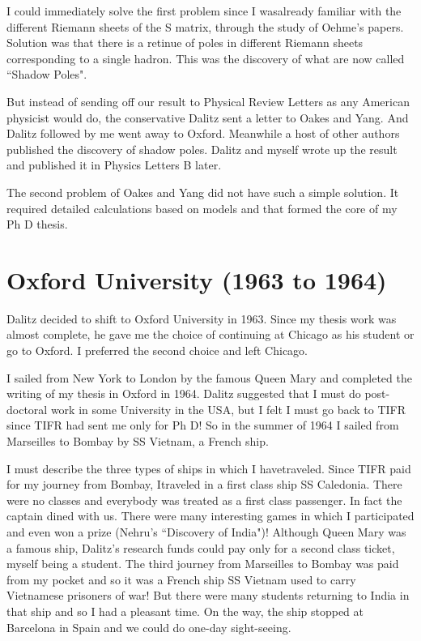 I could immediately solve the first problem since I was\break already familiar 
with the different Riemann sheets of the S matrix, through the study of 
Oehme's papers. Solution was that there is a retinue of poles in 
different Riemann sheets corresponding to a single hadron. This was the 
discovery of what are now called ``Shadow Poles".

But instead of sending off our result to Physical Review Letters as any 
American physicist would do, the conservative Dalitz sent a letter to 
Oakes and Yang. And Dalitz followed by me went away to Oxford. Meanwhile 
a host of other authors published the discovery of shadow poles. Dalitz 
and myself wrote up the result and published it in Physics Letters B 
later.

The second problem of Oakes and Yang did not have such a simple 
solution. It required detailed calculations based on models and that 
formed the core of my Ph D thesis.

\vspace{-\topsep}
\section*{Oxford University (1963 to 1964)}

Dalitz decided to shift to Oxford University in 1963. Since my thesis 
work was almost complete, he gave me the choice of conti\-nuing at Chicago 
as his student or go to Oxford. I preferred the second choice and left 
Chicago.

I sailed from New York to London by the famous Queen Mary and completed 
the writing of my thesis in Oxford in 1964. Dalitz suggested that I must 
do post-doctoral work in some University in the USA, but I felt I must go 
back to TIFR since TIFR had sent me only for Ph D! So in the summer of 
1964 I sailed from Marseilles to Bombay by SS Vietnam, a French ship.

I must describe the three types of ships in which I have\break traveled. 
Since TIFR paid for my journey from Bombay, I\break traveled in a first class 
ship SS Caledonia. There were no classes and everybody was treated as a 
first class passenger. In fact the captain dined with us. There were many 
interesting games in which I participated and even won a prize (Nehru's 
``Discovery of India")! Although Queen Mary was a famous ship, Dalitz's\break 
research funds could pay only for a second class ticket, myself being a 
student. The third journey from Marseilles to Bombay was paid from my 
pocket and so it was a French ship SS Vietnam used to carry Vietnamese 
prisoners of war! But there were many students returning to India in 
that ship and so I had a pleasant time. On the way, the ship stopped at 
Barcelona in Spain and we could do one-day sight-seeing.


